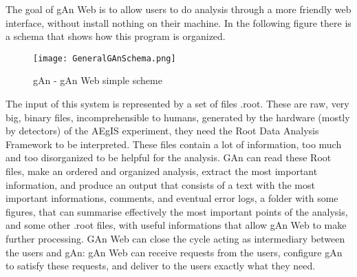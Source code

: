 The goal of gAn Web is to allow users to do analysis through a more friendly web interface, without install nothing on their machine. In the following figure there is a schema that shows how this program is organized.

\begin{figure}[H]
\centering
\texttt{[image: GeneralGAnSchema.png]} 
\caption{gAn - gAn Web simple scheme}
\end{figure}

The input of this system is represented by a set of files .root. These are raw, very big, binary files, incomprehensible to humans, generated by the hardware (mostly by detectors) of the AEgIS experiment, they need the Root Data Analysis Framework to be interpreted. These files contain a lot of information, too much and too disorganized to be helpful for the analysis. GAn can read these Root files, make an ordered and organized analysis, extract the most important information, and produce an output that consists of a text with the most important informations, comments, and eventual error logs, a folder with some figures, that can summarise effectively the most important points of the analysis, and some other .root files, with useful informations that allow gAn Web to make further processing. GAn Web can close the cycle acting as intermediary between the users and gAn: gAn Web can receive requests from the users, configure gAn to satisfy these requests, and deliver to the users exactly what they need.


